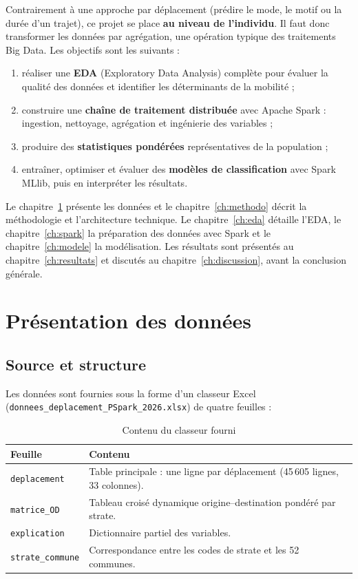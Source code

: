 \documentclass[12pt,a4paper]{report}
\newcommand{\code}[1]{\texttt{\small #1}}
\newcommand{\1}{\mathbf{1}}
\begin{document}
Contrairement à une approche par déplacement (prédire le mode, le motif ou la durée d'un trajet), ce projet se place \textbf{au niveau de l'individu}. Il faut donc transformer les données par agrégation, une opération typique des traitements Big Data. Les objectifs sont les suivants :
\begin{enumerate}[leftmargin=*]
  \item réaliser une \textbf{EDA} (Exploratory Data Analysis) complète pour évaluer la qualité des données et identifier les déterminants de la mobilité ;
  \item construire une \textbf{chaîne de traitement distribuée} avec Apache Spark : ingestion, nettoyage, agrégation et ingénierie des variables ;
  \item produire des \textbf{statistiques pondérées} représentatives de la population ;
  \item entraîner, optimiser et évaluer des \textbf{modèles de classification} avec Spark MLlib, puis en interpréter les résultats.
\end{enumerate}

Le chapitre~\ref{ch:donnees} présente les données et le chapitre~\ref{ch:methodo} décrit la méthodologie et l'architecture technique. Le chapitre~\ref{ch:eda} détaille l'EDA, le chapitre~\ref{ch:spark} la préparation des données avec Spark et le chapitre~\ref{ch:modele} la modélisation. Les résultats sont présentés au chapitre~\ref{ch:resultats} et discutés au chapitre~\ref{ch:discussion}, avant la conclusion générale.

\chapter{Présentation des données}\label{ch:donnees}

\section{Source et structure}
Les données sont fournies sous la forme d'un classeur Excel ({\small\nolinkurl{donnees_deplacement_PSpark_2026.xlsx}}) de quatre feuilles :

\begin{table}[H]
\centering
\caption{Contenu du classeur fourni}\label{tab:feuilles}
\begin{tabularx}{\linewidth}{@{}lX@{}}
\toprule
\textbf{Feuille} & \textbf{Contenu} \\
\midrule
\code{deplacement} & Table principale : une ligne par déplacement (45\,605 lignes, 33 colonnes). \\
\code{matrice\_OD} & Tableau croisé dynamique origine–destination pondéré par strate. \\
\code{explication} & Dictionnaire partiel des variables. \\
\code{strate\_commune} & Correspondance entre les codes de strate et les 52 communes. \\
\bottomrule
\end{tabularx}
\end{table}
\end{document}
